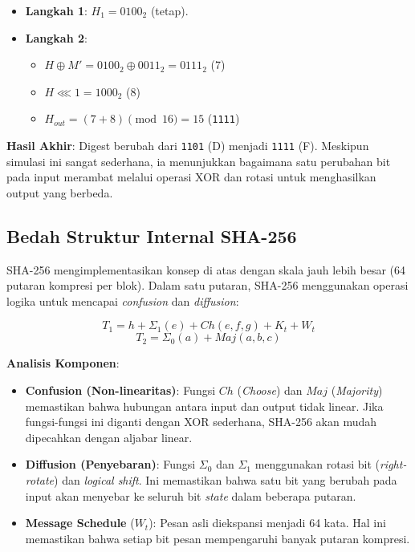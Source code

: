 \begin{itemize}
    \item \textbf{Langkah 1}: $H_1 = 0100_2$ (tetap).
    \item \textbf{Langkah 2}:
    \begin{itemize}
        \item $H \oplus M' = 0100_2 \oplus 0011_2 = 0111_2$ (7)
        \item $H \lll 1 = 1000_2$ (8)
        \item $H_{out} = (7 + 8) \pmod{16} = 15$ (\texttt{1111})
    \end{itemize}
\end{itemize}
\textbf{Hasil Akhir}: Digest berubah dari \texttt{1101} (D) menjadi \texttt{1111} (F). Meskipun simulasi ini sangat sederhana, ia menunjukkan bagaimana satu perubahan bit pada input merambat melalui operasi XOR dan rotasi untuk menghasilkan output yang berbeda.

\subsection{Bedah Struktur Internal SHA-256}

SHA-256 mengimplementasikan konsep di atas dengan skala jauh lebih besar (64 putaran kompresi per blok). Dalam satu putaran, SHA-256 menggunakan operasi logika untuk mencapai \textit{confusion} dan \textit{diffusion}:

\begin{equation}
  T_1 = h + \Sigma_1(e) + Ch(e,f,g) + K_t + W_t
\end{equation}
\begin{equation}
  T_2 = \Sigma_0(a) + Maj(a,b,c)
\end{equation}

\textbf{Analisis Komponen}:
\begin{itemize}
    \item \textbf{Confusion (Non-linearitas)}: Fungsi $Ch$ (\textit{Choose}) dan $Maj$ (\textit{Majority}) memastikan bahwa hubungan antara input dan output tidak linear. Jika fungsi-fungsi ini diganti dengan XOR sederhana, SHA-256 akan mudah dipecahkan dengan aljabar linear.
    \item \textbf{Diffusion (Penyebaran)}: Fungsi $\Sigma_0$ dan $\Sigma_1$ menggunakan rotasi bit (\textit{right-rotate}) dan \textit{logical shift}. Ini memastikan bahwa satu bit yang berubah pada input akan menyebar ke seluruh bit \textit{state} dalam beberapa putaran.
    \item \textbf{Message Schedule} ($W_t$): Pesan asli diekspansi menjadi 64 kata. Hal ini memastikan bahwa setiap bit pesan mempengaruhi banyak putaran kompresi.
\end{itemize}

